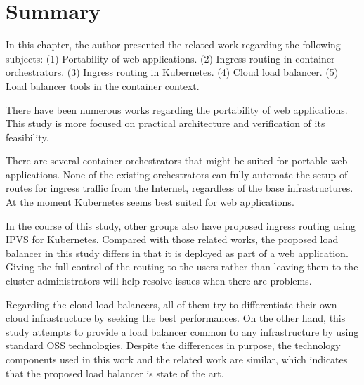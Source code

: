 \section{Summary}

In this chapter, the author presented the related work regarding the following subjects:
(1) Portability of web applications.
(2) Ingress routing in container orchestrators.
(3) Ingress routing in Kubernetes.
(4) Cloud load balancer.
(5) Load balancer tools in the container context.

There have been numerous works regarding the portability of web applications.
This study is more focused on practical architecture and verification of its feasibility.

There are several container orchestrators that might be suited for portable web applications.
None of the existing orchestrators can fully automate the setup of routes for ingress traffic from the Internet, regardless of the base infrastructures.
At the moment Kubernetes seems best suited for web applications.

In the course of this study, other groups also have proposed ingress routing using IPVS for Kubernetes.
Compared with those related works, the proposed load balancer in this study differs in that it is deployed as part of a web application.
Giving the full control of the routing to the users rather than leaving them to the cluster administrators will help resolve issues when there are problems.

Regarding the cloud load balancers, all of them try to differentiate their own cloud infrastructure by seeking the best performances.
On the other hand, this study attempts to provide a load balancer common to any infrastructure by using standard OSS technologies.
Despite the differences in purpose, the technology components used in this work and the related work are similar, which indicates that the proposed load balancer is state of the art.
